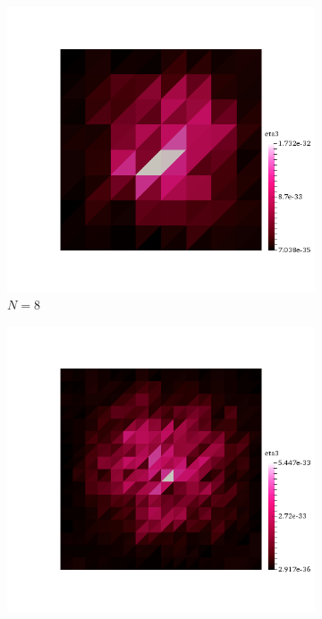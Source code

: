 \begin{figure}[h!]
  \centering
  \begin{subfigure}[b]{0.24\textwidth}
    \includegraphics[width=\textwidth,height=\textheight,keepaspectratio,height=\textheight,keepaspectratio]{figures/2_mpet/default/space/eta3_8.png}
    \caption{$N=8$}
  \end{subfigure}
  \begin{subfigure}[b]{0.24\textwidth}
    \includegraphics[width=\textwidth,height=\textheight,keepaspectratio,height=\textheight,keepaspectratio]{figures/2_mpet/default/space/eta3_16.png}

\end{subfigure}
\end{figure}
